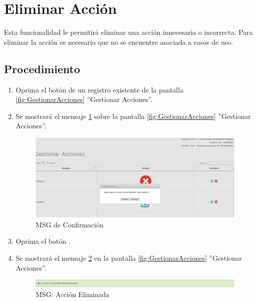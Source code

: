\hypertarget{cv:eliminarAccion}{\section{Eliminar Acción}} \label{sec:eliminarAccion}

	Esta funcionalidad le permitirá eliminar una acción innecesaria o incorrecta. Para eliminar la acción es necesario que no se encuentre asociada a casos de uso.
		\subsection{Procedimiento}

			\begin{enumerate}
	
			\item Oprima el botón \IUBotonEliminar{} de un registro existente de la pantalla \ref{fig:GestionarAcciones} ''Gestionar Acciones''.
	
			\item Se mostrará el mensaje \ref{fig:confirmaEliminaAccion} sobre la pantalla \ref{fig:GestionarAcciones} ''Gestionar Acciones''.
			
			\begin{figure}[htbp!]
				\begin{center}
					\includegraphics[scale=0.5]{roles/lider/pantallas/acciones/pantallas/IU11-1-1-3MSG10}
					\caption{MSG de Confirmación}
					\label{fig:confirmaEliminaAccion}
				\end{center}
			\end{figure}
						
			\item Oprima el botón \IUAceptar.
			
			\item Se mostrará el mensaje \ref{fig:accionEliminada} en la pantalla \ref{fig:GestionarAcciones} ''Gestionar Acciones''.
			
			\begin{figure}[htbp!]
				\begin{center}
					\includegraphics[scale=0.5]{roles/lider/pantallas/acciones/pantallas/IU11-1-1-3MSG1}
					\caption{MSG: Acción Eliminada}
					\label{fig:accionEliminada}
				\end{center}
			\end{figure}
			\end{enumerate}